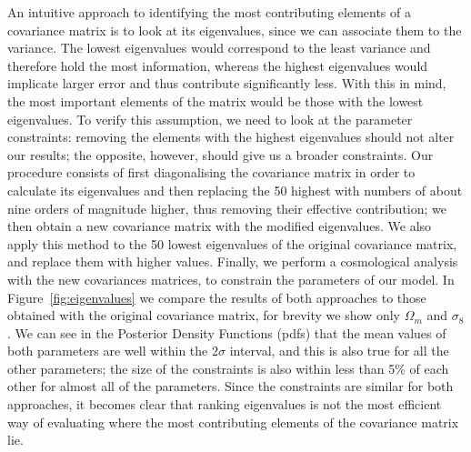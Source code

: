 \documentclass[twocolumn]{\docclass}
\newcommand{\rf}[1]{\ref{fig:#1}}
\begin{document}
An intuitive approach to identifying the most contributing elements of a covariance matrix is to look at its eigenvalues, since we can associate them to the variance. The lowest eigenvalues would correspond to the least variance and therefore hold the most information, whereas the highest eigenvalues would implicate larger error and thus contribute significantly less. With this in mind, the most important elements of the matrix would be those with the lowest eigenvalues. To verify this assumption, we need to look at the parameter constraints: removing the elements with the highest eigenvalues should not alter our results; the opposite, however, should give us a broader constraints. Our procedure consists of first diagonalising the covariance matrix in order to calculate its eigenvalues and then replacing the 50 highest with numbers of about nine orders of magnitude higher, thus removing their effective contribution; we then obtain a new covariance matrix with the modified eigenvalues. We also apply this method to the 50 lowest eigenvalues of the original covariance matrix, and replace them with higher values. Finally, we perform a cosmological analysis with the new covariances matrices, to constrain the parameters of our model. In Figure~\rf{eigenvalues} we compare the results of both approaches to those obtained with the original covariance matrix, for brevity we show only $\Omega_m$ and $\sigma_8$. We can see in the Posterior Density Functions (pdfs) that the mean values of both parameters are well within the $2\sigma$ interval, and this is also true for all the other parameters; the size of the constraints is also within less than 5\% of each other for almost all of the parameters. Since the constraints are similar for both approaches, it becomes clear that ranking eigenvalues is not the most efficient way of evaluating where the most contributing elements of the covariance matrix lie.
\end{document}
